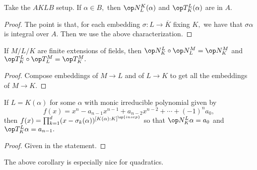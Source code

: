 \begin{prop}
    Take the $AKLB$ setup. If $\alpha\in B,$ then $\op N_L^K(\alpha)$ and $\op T_K^L(\alpha)$ are in $A.$
\end{prop}
\begin{proof}
    The point is that, for each embedding $\sigma:L\to\overline K$ fixing $K,$ we have that $\sigma\alpha$ is integral over $A.$ Then we use the above characterization.
\end{proof}
\begin{cor}
    If $M/L/K$ are finite extensions of fields, then $\op N_K^L\circ\op N^M_L=\op N^M_K$ and $\op T^L_K\circ\op T^M_L=\op T^M_K.$
\end{cor}
\begin{proof}
    Compose embeddings of $M\to L$ and of $L\to K$ to get all the embeddings of $M\to K.$
\end{proof}
\begin{cor}
    If $L=K(\alpha)$ for some $\alpha$ with monic irreducible polynomial given by
    \[f(x)=x^n-a_{n-1}x^{n-1}+a_{n-2}x^{n-2}+\cdots+(-1)^na_0,\]
    then $f(x)=\prod_{k=1}^d(x-\sigma_k(\alpha))^{[K(\alpha):K]^{\op{insep}}}$ so that $\op N^L_K\alpha=a_0$ and $\op T_K^L\alpha=a_{n-1}.$
\end{cor}
\begin{proof}
    Given in the statement.
\end{proof}
The above corollary is especially nice for quadratics.